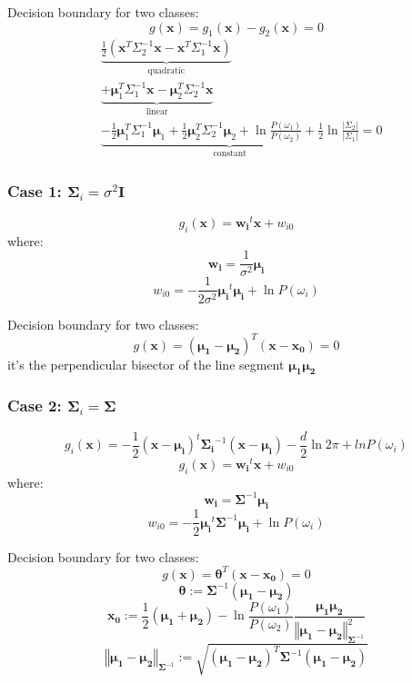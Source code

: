 \documentclass{report}
\begin{document}
Decision boundary for two classes:
\[g(\symbf{x}) = g_1(\symbf{x}) - g_2(\symbf{x}) = 0\]
\[\begin{split}
	&\underbrace{\frac{1}{2} \left( \symbf{x}^T \Sigma_2^{-1} \symbf{x} - \symbf{x}^T \Sigma_1^{-1} \symbf{x} \right)}_{\text{quadratic}} \\
	&\underbrace{+ \symbf{\mu}_1^T \Sigma_1^{-1} \symbf{x} - \symbf{\mu}_2^T \Sigma_2^{-1} \symbf{x}}_{\text{linear}} \\
	&\underbrace{- \frac{1}{2} \symbf{\mu}_1^T \Sigma_1^{-1} \symbf{\mu}_1 + \frac{1}{2} \symbf{\mu}_2^T \Sigma_2^{-1} \symbf{\mu}_2 + \ln \frac{P(\omega_1)}{P(\omega_2)} + \frac{1}{2} \ln \frac{|\Sigma_2|}{|\Sigma_1|}}_{\text{constant}} = 0
\end{split}\]

\subsubsection*{Case 1: $\symbf{\Sigma}_i = \sigma^2 \symbf{I}$}
\[g_i(\symbf{x}) = \symbf{w_i}^t \symbf{x} + w_{i0}\]
where:
\[\symbf{w_i} = \frac{1}{\sigma^{2}} \symbf{\mu_i}\]
\[w_{i0} = -\frac{1}{2\sigma^2}\symbf{\mu_i}^t \symbf{\mu_i} + \ln P(\omega_i) \]

Decision boundary for two classes:
\[g(\symbf{x}) = (\symbf{\mu_1} - \symbf{\mu_2})^T (\symbf{x} - \symbf{x_0}) = 0\]
it's the perpendicular bisector of the line segment $\symbf{\mu_1} \symbf{\mu_2}$

\subsubsection*{Case 2: $\symbf{\Sigma}_i = \symbf{\Sigma}$}
\[g_i(\symbf{x}) = -\frac{1}{2} (\symbf{x} - \symbf{\mu_i})^t \symbf{\Sigma_i}^{-1} (\symbf{x} - \symbf{\mu_i}) - \frac{d}{2}\ln2\pi + ln P(\omega_i)\]
\[g_i(\symbf{x}) = \symbf{w_i}^t \symbf{x} + w_{i0}\]
where:
\[\symbf{w_i} = \symbf{\Sigma}^{-1} \symbf{\mu_i}\]
\[w_{i0} = -\frac{1}{2}\symbf{\mu_i}^t \symbf{\Sigma}^{-1} \symbf{\mu_i} + \ln P(\omega_i) \]

Decision boundary for two classes:
\[g(\symbf{x}) = \symbf{\theta}^T (\symbf{x} - \symbf{x_0}) = 0\]
\[\symbf{\theta} := \symbf{\Sigma}^{-1} (\symbf{\mu_1} - \symbf{\mu_2})\]
\[\symbf{x_0} := \frac{1}{2} (\symbf{\mu_1} + \symbf{\mu_2}) - \ln \frac{P(\omega_1)}{P(\omega_2)} \frac{\symbf{\mu_1} \symbf{\mu_2}}{\left\Vert \symbf{\mu_1} - \symbf{\mu_2} \right\Vert_{\symbf{\Sigma}^{-1}}^2}\]
\[\left\Vert \symbf{\mu_1} - \symbf{\mu_2} \right\Vert_{\symbf{\Sigma}^{-1}} := \sqrt{(\symbf{\mu_1} - \symbf{\mu_2})^T \symbf{\Sigma}^{-1} (\symbf{\mu_1} - \symbf{\mu_2})}\]
\end{document}
